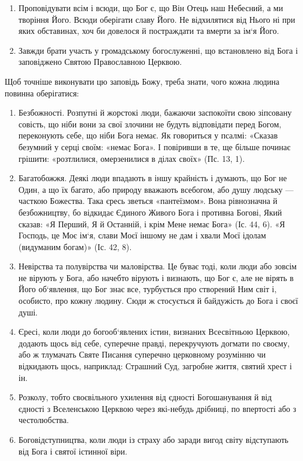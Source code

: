 \documentclass[main.tex]{subfiles}
\begin{document}
\begin{enumerate}
    \item Проповідувати всім і всюди, що Бог є, що Він Отець наш Небесний, а ми творіння Його. Всюди оберігати славу Його. Не відхилятися від Нього ні при яких обставинах, хоч би довелося й постраждати та вмерти за ім`я Його.
    \item Завжди брати участь у громадському богослуженні, що встановлено від Бога і заповіджено Святою Православною Церквою.
\end{enumerate}

Щоб точніше виконувати цю заповідь Божу, треба знати, чого кожна людина повинна оберігатися:

\begin{enumerate}
    \item Безбожності. Розпутні й жорстокі люди, бажаючи заспокоїти свою зіпсовану совість, що ніби вони за свої злочини не будуть відповідати перед Богом, переконують себе, що ніби Бога немає. Як говориться у псалмі: «Сказав безумний у серці своїм: «немає Бога». І повіривши в те, ще більше починає грішити: «розтлилися, омерзенилися в ділах своїх» (Пс. 13, 1).
    \item Багатобожжя. Деякі люди впадають в іншу крайність і думають, що Бог не Один, а що їх багато, або природу вважають всебогом, або душу людську — часткою Божества. Така єресь зветься «пантеїзмом». Вона рівнозначна й безбожництву, бо відкидає Єдиного Живого Бога і противна Богові, Який сказав: «Я Перший, Я й Останній, і крім Мене немає Бога» (Іс. 44, 6). «Я Господь, це Моє ім`я, слави Моєї іншому не дам і хвали Моєї ідолам (видуманим богам)» (Іс. 42, 8).
    \item Невірства та полувірства чи маловірства. Це буває тоді, коли люди або зовсім не вірують у Бога, або начебто вірують і визнають, що Бог є, але не вірять в Його об`явлення, що Бог знає все, турбується про створений Ним світ і, особисто, про кожну людину. Сюди ж стосується й байдужість до Бога і своєї душі.
    \item Єресі, коли люди до богооб`явлених істин, визнаних Всесвітньою Церквою, додають щось від себе, суперечне правді, перекручують догмати по своєму, або ж тлумачать Святе Писання суперечно церковному розумінню чи відкидають щось, наприклад: Страшний Суд, загробне життя, святий хрест і ін.
    \item Розколу, тобто своєвільного ухилення від єдності Богошанування й від єдності з Вселенською Церквою через які-небудь дрібниці, по впертості або з честолюбства.
    \item Боговідступництва, коли люди із страху або заради вигод світу відступають від Бога і святої істинної віри.

\end{enumerate}
\end{document}
